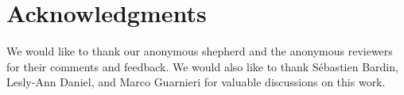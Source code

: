 \documentclass[conference]{IEEEtran}
\begin{document}
\section*{Acknowledgments}

We would like to thank our anonymous shepherd and the anonymous reviewers for their comments and feedback. We would also like to thank Sébastien Bardin, Lesly-Ann Daniel, and Marco Guarnieri for valuable discussions on this work.



\end{document}
